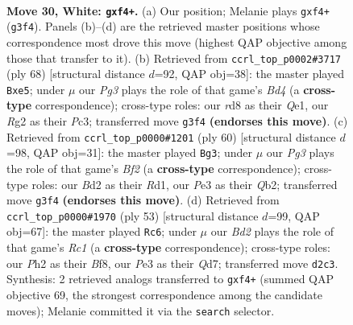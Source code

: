 \documentclass[11pt]{article}
\begin{document}
\clearpage

\begin{figure}[p]\centering
\begin{subfigure}{0.46\textwidth}\centering
\resizebox{\linewidth}{!}{%
\newchessgame
\chessboard[
  setfen={1r1rn1k1/p1p2p2/8/2Pp1q1p/5p2/1P2P1P1/1Q1B2RP/4KBR1 w - - 0 30},
  showmover=false,
  pgfstyle=straightmove, color=movearrow, markmove={g3-f4}
]}
\caption{}
\end{subfigure}\hfill
\begin{subfigure}{0.46\textwidth}\centering
\resizebox{\linewidth}{!}{%
\newchessgame
\chessboard[
  setfen={r6k/5rpb/2q4p/pp1pp2P/3B2B1/2Pp1PR1/6K1/R3Q3 w - - 0 35},
  showmover=false,
  pgfstyle=straightmove, color=movearrow, markmove={d4-e5}
]}
\caption{}
\end{subfigure}
\\[4pt]
\begin{subfigure}{0.46\textwidth}\centering
\resizebox{\linewidth}{!}{%
\newchessgame
\chessboard[
  setfen={2r3k1/p4p2/n1rq3p/2p3p1/3pP3/PP3P2/1Q1R1BPP/3R2K1 w - - 2 31},
  showmover=false,
  pgfstyle=straightmove, color=movearrow, markmove={f2-g3}
]}
\caption{}
\end{subfigure}\hfill
\begin{subfigure}{0.46\textwidth}\centering
\resizebox{\linewidth}{!}{%
\newchessgame
\chessboard[
  setfen={2rr1bk1/3q4/1p5p/p1p2p2/P2P4/5Q1P/3B1PP1/R3R1K1 b - - 0 27},
  showmover=false,
  pgfstyle=straightmove, color=movearrow, markmove={c8-c6}
]}
\caption{}
\end{subfigure}
\caption{\textbf{Move 30, White: \texttt{gxf4+}.} (a) Our position; Melanie plays \texttt{gxf4+} (\texttt{g3f4}). Panels (b)--(d) are the retrieved master positions whose correspondence most drove this move (highest QAP objective among those that transfer to it). (b) Retrieved from \texttt{ccrl\_top\_p0002\#3717} (ply 68) [structural distance $d$=92, QAP obj=38]: the master played \texttt{Bxe5}; under $\mu$ our \emph{Pg3} plays the role of that game's \emph{Bd4} (a \textbf{cross-type} correspondence); cross-type roles: our \emph{r}d8 as their \emph{Q}e1, our \emph{R}g2 as their \emph{P}c3; transferred move \texttt{g3f4} \textbf{(endorses this move)}. (c) Retrieved from \texttt{ccrl\_top\_p0000\#1201} (ply 60) [structural distance $d$=98, QAP obj=31]: the master played \texttt{Bg3}; under $\mu$ our \emph{Pg3} plays the role of that game's \emph{Bf2} (a \textbf{cross-type} correspondence); cross-type roles: our \emph{B}d2 as their \emph{R}d1, our \emph{P}e3 as their \emph{Q}b2; transferred move \texttt{g3f4} \textbf{(endorses this move)}. (d) Retrieved from \texttt{ccrl\_top\_p0000\#1970} (ply 53) [structural distance $d$=99, QAP obj=67]: the master played \texttt{Rc6}; under $\mu$ our \emph{Bd2} plays the role of that game's \emph{Rc1} (a \textbf{cross-type} correspondence); cross-type roles: our \emph{P}h2 as their \emph{B}f8, our \emph{P}e3 as their \emph{Q}d7; transferred move \texttt{d2c3}. Synthesis: 2 retrieved analogs transferred to \texttt{gxf4+} (summed QAP objective 69, the strongest correspondence among the candidate moves); Melanie committed it via the \texttt{search} selector.}
\label{fig:thought-m58}
\end{figure}
\end{document}
